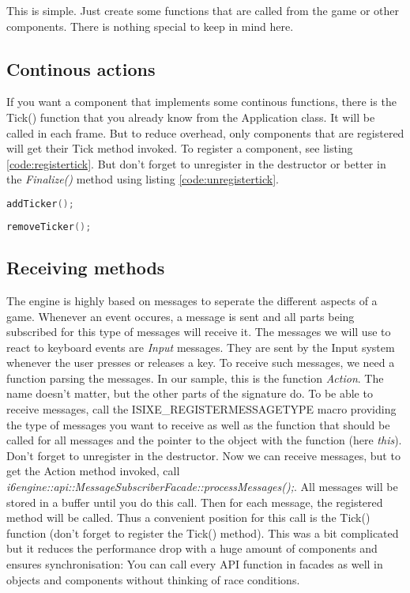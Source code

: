 \documentclass{article}
\begin{document}
This is simple. Just create some functions that are called from the game or other components. There is nothing special to keep in mind here.

\subsection{Continous actions}

If you want a component that implements some continous functions, there is the Tick() function that you already know from the Application class. It will be called in each frame. But to reduce overhead, only components that are registered will get their Tick method invoked. To register a component, see listing \ref{code:registertick}. But don't forget to unregister in the destructor or better in the \textit{Finalize()} method using listing \ref{code:unregistertick}.
\begin{lstlisting}[language=C++, style=basic, caption={}, label=code:registertick]
addTicker();
\end{lstlisting}
\begin{lstlisting}[language=C++, style=basic, caption={}, label=code:unregistertick]
removeTicker();
\end{lstlisting}

\subsection{Receiving methods}

The engine is highly based on messages to seperate the different aspects of a game. Whenever an event occures, a message is sent and all parts being subscribed for this type of messages will receive it. The messages we will use to react to keyboard events are \textit{Input} messages. They are sent by the Input system whenever the user presses or releases a key. To receive such messages, we need a function parsing the messages. In our sample, this is the function \textit{Action}. The name doesn't matter, but the other parts of the signature do. To be able to receive messages, call the ISIXE_REGISTERMESSAGETYPE macro providing the type of messages you want to receive as well as the function that should be called for all messages and the pointer to the object with the function (here \textit{this}). Don't forget to unregister in the destructor. Now we can receive messages, but to get the Action method invoked, call \textit{i6engine::api::MessageSubscriberFacade::processMessages();}. All messages will be stored in a buffer until you do this call. Then for each message, the registered method will be called. Thus a convenient position for this call is the Tick() function (don't forget to register the Tick() method). This was a bit complicated but it reduces the performance drop with a huge amount of components and ensures synchronisation: You can call every API function in facades as well in objects and components without thinking of race conditions.
\end{document}
